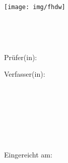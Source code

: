 
\begin{titlepage}

\begin{center}
\texttt{[image: img/fhdw]}

\vspace{7mm}

\Huge{\bfseries\dokumententyp}\\

\vspace{5mm}

\LARGE{\dokumententitel}\\

\vspace{15mm}

\large{Prüfer(in):\\

\dokumentenpruefer 

\vspace{15mm}

Verfasser(in):\\

\dokumentenautor\\

\martikelnummer\\

\vspace{3mm}

\dokumentenautoradress\\

\vspace{7mm}

\studiengang\\

\spezialisierungsbereich\\

}

\enlargethispage{2em}

\vspace{15mm}

\large{Eingereicht am:\\

\abgabedatum \\

}

\end{center}


\end{titlepage}

